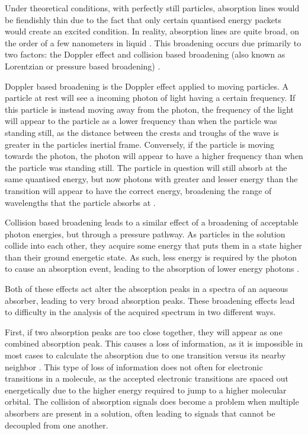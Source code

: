 Under theoretical conditions, with perfectly still particles, absorption lines
would be fiendishly thin due to the fact that only certain quantised energy
packets would create an excited condition. In reality, absorption lines are
quite broad, on the order of a few nanometers in liquid \cite{Hollas:2004uh}.
This broadening occurs due primarily to two factors: the Doppler effect and
collision based broadening (also known as Lorentzian or pressure based
broadening) \cite{Olivero:1977ul}.

Doppler based broadening is the Doppler effect applied to moving particles. A
particle at rest will see a incoming photon of light having a certain
frequency. If this particle is instead moving away from the photon, the
frequency of the light will appear to the particle as a lower frequency than
when the particle was standing still, as the distance between the crests and
troughs of the wave is greater in the particles inertial frame. Conversely, if
the particle is moving towards the photon, the photon will appear to have a
higher frequency than when the particle was standing still. The particle in
question will still absorb at the same quantised energy, but now photons with
greater and lesser energy than the transition will appear to have the correct
energy, broadening the range of wavelengths that the particle absorbs
at \cite{Fox:2006uy}.

Collision based broadening leads to a similar effect of a broadening of
acceptable photon energies, but through a pressure pathway. As particles in
the solution collide into each other, they acquire some energy that puts them
in a state higher than their ground energetic state. As such, less energy is
required by the photon to cause an absorption event, leading to the absorption
of lower energy photons \cite{Ngo:2012jk}.

Both of these effects act alter the absorption peaks in a spectra of an aqueous
absorber, leading to very broad absorption peaks. These broadening effects lead
to difficulty in the analysis of the acquired spectrum in two different ways.

First, if two absorption peaks are too close together, they will appear as one
combined absorption peak. This causes a loss of information, as it is
impossible in most cases to calculate the absorption due to one transition
versus its nearby neighbor \cite{Fowles:1975wg}. This type of loss of
information does not often for electronic transitions in a molecule, as the
accepted electronic transitions are spaced out energetically due to the higher
energy required to jump to a higher molecular orbital. The collision of
absorption signals does become a problem when multiple absorbers are present in
a solution, often leading to signals that cannot be decoupled from one another.

